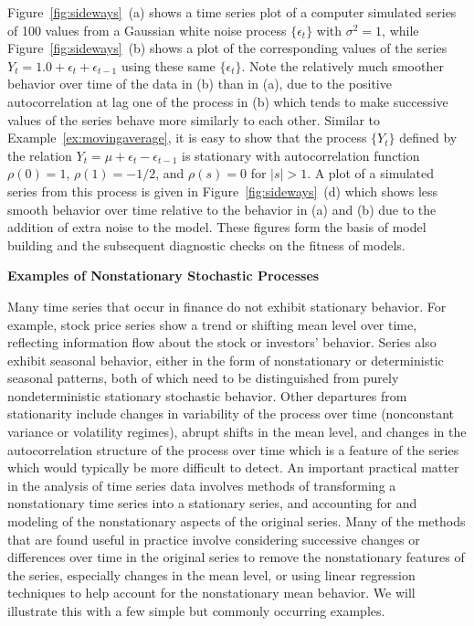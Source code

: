 \begin{ex}
Figure~\ref{fig:sideways}~(a) shows a time series plot of a computer simulated series of 100 values from a Gaussian white noise process $\{ \epsilon_t \}$ with $\sigma^2= 1$, while Figure~\ref{fig:sideways}~(b) shows a plot of the corresponding values of the series $Y_t = 1.0 + \epsilon_{t} + \epsilon_{t-1}$ using these same $\{\epsilon_t\}$.  Note the relatively much smoother behavior over time of the data in (b) than in (a), due to the positive autocorrelation at lag one of the process in (b) which tends to make successive values of the series behave more similarly to each other.  Similar to Example~\ref{ex:movingaverage}, it is easy to show that the process $\{Y_t\}$ defined by the relation $Y_t = \mu + \epsilon_{t} - \epsilon_{t-1}$ is stationary with autocorrelation function $\rho(0)= 1$, $\rho(1)= -1/2$, and $\rho(s)= 0$ for $\lvert s\rvert >1$. A plot of a simulated series from this process is given in Figure~\ref{fig:sideways}~(d) which shows less smooth behavior over time relative to the behavior  in (a) and (b) due to the addition of extra noise to the model. These figures form the basis of model building and the subsequent diagnostic checks on the fitness of models. \xqed
\end{ex} 


\noindent \textbf{Examples of Nonstationary Stochastic Processes} \label{in:nonstat1} \twomedskip


Many time series that occur in finance do not exhibit stationary behavior.  For example, stock price series show a trend or shifting mean level over time, reflecting information flow about the stock or investors' behavior. Series also exhibit seasonal behavior, either in the form of nonstationary or deterministic seasonal patterns, both of which need to be distinguished from purely nondeterministic stationary stochastic behavior. Other departures from stationarity include changes in variability of the process over time (nonconstant variance or volatility regimes), abrupt shifts in the mean level, and changes in the autocorrelation structure of the process over time which is a feature of the series which would typically be more difficult to detect.  An important practical matter in the analysis of time series data involves methods of transforming a nonstationary time series into a stationary series, and accounting for and modeling of the nonstationary aspects of the original series. Many of the methods that are found useful in practice involve considering successive changes or differences over time in the original series to remove the nonstationary features of the series, especially changes in the mean level, or using linear regression techniques to help account for the nonstationary mean behavior.  We will illustrate this with a few simple but commonly occurring examples. 


